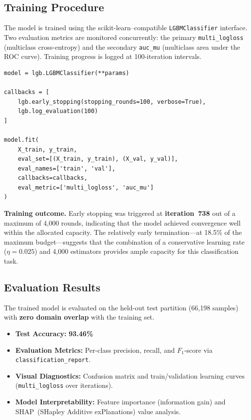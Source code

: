 \documentclass[a4paper,12pt]{article}
\begin{document}
\subsection{Training Procedure}
\label{sec:train_procedure}

The model is trained using the scikit-learn--compatible \texttt{LGBMClassifier} interface. Two evaluation metrics are monitored concurrently: the primary \texttt{multi\_logloss} (multiclass cross-entropy) and the secondary \texttt{auc\_mu} (multiclass area under the ROC curve). Training progress is logged at 100-iteration intervals.

\begin{lstlisting}[caption={LightGBM training procedure}]
model = lgb.LGBMClassifier(**params)

callbacks = [
    lgb.early_stopping(stopping_rounds=100, verbose=True),
    lgb.log_evaluation(100)
]

model.fit(
    X_train, y_train,
    eval_set=[(X_train, y_train), (X_val, y_val)],
    eval_names=['train', 'val'],
    callbacks=callbacks,
    eval_metric=['multi_logloss', 'auc_mu']
)
\end{lstlisting}

\textbf{Training outcome.} Early stopping was triggered at \textbf{iteration~738} out of a maximum of 4,000 rounds, indicating that the model achieved convergence well within the allocated capacity. The relatively early termination---at 18.5\% of the maximum budget---suggests that the combination of a conservative learning rate ($\eta = 0.025$) and 4,000 estimators provides ample capacity for this classification task.

\subsection{Evaluation Results}
\label{sec:results}

The trained model is evaluated on the held-out test partition (66,198 samples) with \textbf{zero domain overlap} with the training set.

\begin{itemize}
    \item \textbf{Test Accuracy:} \textbf{93.46\%}
    \item \textbf{Evaluation Metrics:} Per-class precision, recall, and $F_1$-score via \texttt{classification\_report}.
    \item \textbf{Visual Diagnostics:} Confusion matrix and train/validation learning curves (\texttt{multi\_logloss} over iterations).
    \item \textbf{Model Interpretability:} Feature importance (information gain) and SHAP~(SHapley Additive exPlanations) value analysis.
\end{itemize}
\end{document}
